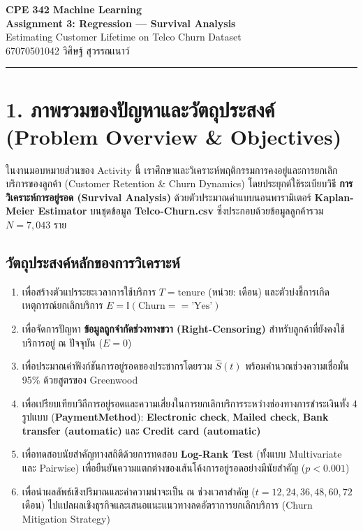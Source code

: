 \documentclass[12pt,a4paper]{article}
\newcommand{\codevar}[1]{\textcolor{codeaccent}{\textbf{#1}}}
\begin{document}
\begin{center}
    {\Large\textbf{CPE 342 Machine Learning}}\\[2pt]
    {\Large\textbf{Assignment 3: Regression — Survival Analysis}}\\[4pt]
    {\large Estimating Customer Lifetime on Telco Churn Dataset}\\[6pt]
    \textcolor{accentblue}{67070501042 วิศิษฐ์ สุวรรณเนาว์}
\end{center}

\noindent\rule{\textwidth}{0.4pt}\vspace{4pt}

\section*{1. ภาพรวมของปัญหาและวัตถุประสงค์\\ \large(Problem Overview \& Objectives)}

ในงานมอบหมายส่วนของ Activity นี้ เราศึกษาและวิเคราะห์พฤติกรรมการคงอยู่และการยกเลิกบริการของลูกค้า (Customer Retention \& Churn Dynamics) โดยประยุกต์ใช้ระเบียบวิธี \textbf{การวิเคราะห์การอยู่รอด (Survival Analysis)} ด้วยตัวประมาณค่าแบบนอนพารามิเตอร์ \textbf{Kaplan-Meier Estimator} บนชุดข้อมูล \codevar{Telco-Churn.csv} ซึ่งประกอบด้วยข้อมูลลูกค้ารวม $N = 7,043$ ราย

\subsection*{วัตถุประสงค์หลักของการวิเคราะห์}
\begin{enumerate}[leftmargin=18pt, itemsep=2pt]
    \item เพื่อสร้างตัวแปรระยะเวลาการใช้บริการ $T = \text{tenure}$ (หน่วย: เดือน) และตัวบ่งชี้การเกิดเหตุการณ์ยกเลิกบริการ $E = \mathbb{I}(\text{Churn} == \text{'Yes'})$
    \item เพื่อจัดการปัญหา \textbf{ข้อมูลถูกจำกัดช่วงทางขวา (Right-Censoring)} สำหรับลูกค้าที่ยังคงใช้บริการอยู่ ณ ปัจจุบัน ($E = 0$)
    \item เพื่อประมาณค่าฟังก์ชันการอยู่รอดของประชากรโดยรวม $\hat{S}(t)$ พร้อมคำนวณช่วงความเชื่อมั่น 95\% ด้วยสูตรของ Greenwood
    \item เพื่อเปรียบเทียบวิถีการอยู่รอดและความเสี่ยงในการยกเลิกบริการระหว่างช่องทางการชำระเงินทั้ง 4 รูปแบบ (\codevar{PaymentMethod}): \textbf{Electronic check}, \textbf{Mailed check}, \textbf{Bank transfer (automatic)} และ \textbf{Credit card (automatic)}
    \item เพื่อทดสอบนัยสำคัญทางสถิติด้วยการทดสอบ \textbf{Log-Rank Test} (ทั้งแบบ Multivariate และ Pairwise) เพื่อยืนยันความแตกต่างของเส้นโค้งการอยู่รอดอย่างมีนัยสำคัญ ($p < 0.001$)
    \item เพื่อนำผลลัพธ์เชิงปริมาณและค่าความน่าจะเป็น ณ ช่วงเวลาสำคัญ ($t = 12, 24, 36, 48, 60, 72$ เดือน) ไปแปลผลเชิงธุรกิจและเสนอแนะแนวทางลดอัตราการยกเลิกบริการ (Churn Mitigation Strategy)
\end{enumerate}
\end{document}
